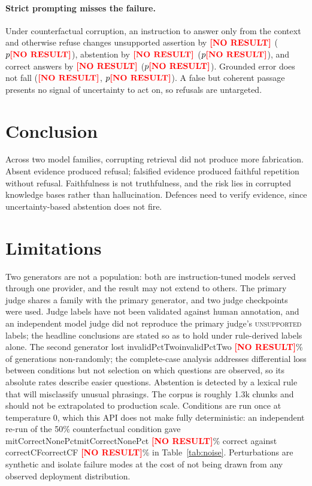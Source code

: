 \documentclass[11pt]{article}
\newcommand{\NUM}[1]{%
  \ifcsname #1\endcsname\csname #1\endcsname\else
  \textcolor{red}{\textbf{[NO RESULT]}}\fi}
\begin{document}


\paragraph{Strict prompting misses the failure.}
Under counterfactual corruption, an instruction to answer only from the context and
otherwise refuse changes unsupported assertion by \(\NUM{mitDeltaHallu}\)
(\(p \NUM{mitPHallu}\)), abstention by \(\NUM{mitDeltaAbstain}\)
(\(p \NUM{mitPAbstain}\)), and correct answers by \(\NUM{mitDeltaCorrect}\)
(\(p \NUM{mitPCorrect}\)). Grounded error does not fall
(\(\NUM{mitDeltaGrounded}\), \(p \NUM{mitPGrounded}\)). A false but coherent passage
presents no signal of uncertainty to act on, so refusals are untargeted.

\section{Conclusion}
Across two model families, corrupting retrieval did not produce more fabrication. Absent
evidence produced refusal; falsified evidence produced faithful repetition without
refusal. Faithfulness is not truthfulness, and the risk lies in corrupted knowledge
bases rather than hallucination. Defences need to verify evidence, since
uncertainty-based abstention does not fire.

\section*{Limitations}
Two generators are not a population: both are instruction-tuned models served through
one provider, and the result may not extend to others. The primary judge shares a
family with the primary generator, and two judge checkpoints were used. Judge labels
have not been validated against human annotation, and an independent model judge did
not reproduce the primary judge's \textsc{unsupported} labels; the headline
conclusions are stated so as to hold under rule-derived labels alone. The second
generator lost \NUM{invalidPctTwo}\% of generations non-randomly; the complete-case
analysis addresses differential loss between conditions but not selection on which
questions are observed, so its absolute rates describe easier questions. Abstention
is detected by a lexical rule that will misclassify unusual phrasings. The corpus is
roughly 1.3k chunks and should not be extrapolated to production scale. Conditions
are run once at temperature 0, which this API does not make fully deterministic: an
independent re-run of the 50\% counterfactual condition gave
\NUM{mitCorrectNonePct}\% correct against \NUM{correctCF}\% in Table~\ref{tab:noise}.
Perturbations are synthetic and isolate failure modes at the cost of not being drawn
from any observed deployment distribution.
\end{document}
